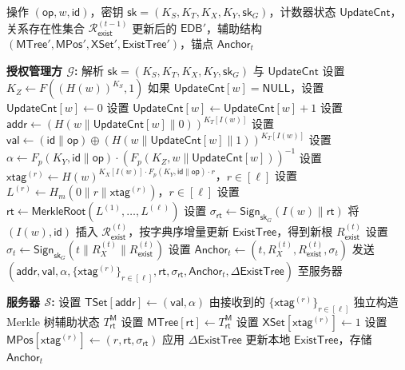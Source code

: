 \begin{breakablealgorithm}
\caption{扩展更新流程 $\mathsf{Update}'$}
\label{alg:commit-update}
\begin{algorithmic}[1]
\REQUIRE 操作 $(\mathsf{op},w,\mathsf{id})$，密钥 $\mathsf{sk}=(K_S,K_T,K_X,K_Y,\mathsf{sk}_G)$，计数器状态 $\mathsf{UpdateCnt}$，\\关系存在性集合 $\mathcal{R}_{\mathsf{exist}}^{(t-1)}$
\ENSURE 更新后的 $\mathsf{EDB}'$，辅助结构 $(\mathsf{MTree}',\mathsf{MPos}',\mathsf{XSet}',\mathsf{ExistTree}')$，锚点 $\mathsf{Anchor}_t$
\item[] \textbf{授权管理方 $\mathcal{G}$:}
\STATE 解析 $\mathsf{sk}=(K_S,K_T,K_X,K_Y,\mathsf{sk}_G)$ 与 $\mathsf{UpdateCnt}$
\STATE 设置 $K_Z \leftarrow F((H(w))^{K_S},1)$
\STATE 如果 $\mathsf{UpdateCnt}[w]=\mathsf{NULL}$，设置 $\mathsf{UpdateCnt}[w]\leftarrow 0$
\STATE 设置 $\mathsf{UpdateCnt}[w]\leftarrow \mathsf{UpdateCnt}[w]+1$
\STATE 设置 $\mathsf{addr}\leftarrow (H(w\|\mathsf{UpdateCnt}[w]\|0))^{K_T[I(w)]}$
\STATE 设置 $\mathsf{val}\leftarrow (\mathsf{id}\|\mathsf{op})\oplus (H(w\|\mathsf{UpdateCnt}[w]\|1))^{K_T[I(w)]}$
\STATE 设置 $\alpha\leftarrow F_p(K_Y,\mathsf{id}\|\mathsf{op})\cdot (F_p(K_Z,w\|\mathsf{UpdateCnt}[w]))^{-1}$
\STATE 设置 $\mathsf{xtag}^{(r)}\leftarrow H(w)^{K_X[I(w)]\cdot F_p(K_Y,\mathsf{id}\|\mathsf{op})\cdot r}$，$r\in[\ell]$
\STATE 设置 $L^{(r)}\leftarrow H_m(0\|r\|\mathsf{xtag}^{(r)})$，$r\in[\ell]$
\STATE 设置 $\mathsf{rt}\leftarrow \mathsf{MerkleRoot}(L^{(1)},\ldots,L^{(\ell)})$
\STATE 设置 $\sigma_{\mathsf{rt}}\leftarrow \mathsf{Sign}_{\mathsf{sk}_G}(I(w)\|\mathsf{rt})$
\STATE 将 $(I(w),\mathsf{id})$ 插入 $\mathcal{R}_{\mathsf{exist}}^{(t)}$，按字典序增量更新 $\mathsf{ExistTree}$，得到新根 $R_{\mathsf{exist}}^{(t)}$
\STATE 设置 $\sigma_t\leftarrow \mathsf{Sign}_{\mathsf{sk}_G}(t\|R_X^{(t)}\|R_{\mathsf{exist}}^{(t)})$
\STATE 设置 $\mathsf{Anchor}_t\leftarrow (t,R_X^{(t)},R_{\mathsf{exist}}^{(t)},\sigma_t)$
\STATE 发送 $(\mathsf{addr},\mathsf{val},\alpha,\{\mathsf{xtag}^{(r)}\}_{r\in[\ell]},\mathsf{rt},\sigma_{\mathsf{rt}},\mathsf{Anchor}_t,\Delta\mathsf{ExistTree})$ 至服务器
\item[] \textbf{服务器 $\mathcal{S}$:}
\STATE 设置 $\mathsf{TSet}[\mathsf{addr}]\leftarrow (\mathsf{val},\alpha)$
\STATE 由接收到的 $\{\mathsf{xtag}^{(r)}\}_{r\in[\ell]}$ 独立构造 Merkle 树辅助状态 $T_{\mathsf{rt}}^{\mathsf{M}}$
  \STATE 设置 $\mathsf{MTree}[\mathsf{rt}]\leftarrow T_{\mathsf{rt}}^{\mathsf{M}}$
    \STATE 设置 $\mathsf{XSet}[\mathsf{xtag}^{(r)}]\leftarrow 1$
    \STATE 设置 $\mathsf{MPos}[\mathsf{xtag}^{(r)}]\leftarrow (r,\mathsf{rt},\sigma_{\mathsf{rt}})$
  \ENDFOR
\STATE 应用 $\Delta\mathsf{ExistTree}$ 更新本地 $\mathsf{ExistTree}$，存储 $\mathsf{Anchor}_t$
\end{algorithmic}
\end{breakablealgorithm}

